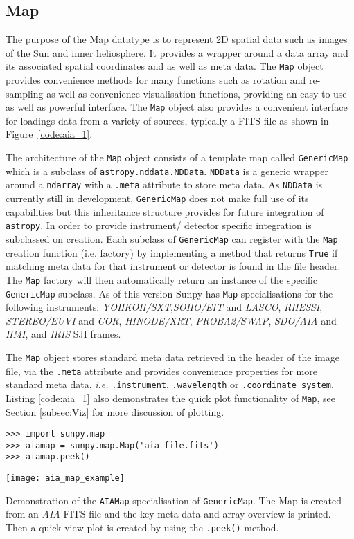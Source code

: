 \subsection{Map}
The purpose of the Map datatype is to represent 2D spatial data such as images of the Sun and 
inner heliosphere. It provides a wrapper around a data array and its associated
spatial coordinates and as well as meta data. The \texttt{Map} object provides 
convenience methods for many functions 
such as rotation and re-sampling as well as convenience visualisation 
functions, providing an easy to use as well as powerful interface. The \texttt{Map} object
also provides a convenient interface for loadings data from a variety of sources, typically
a FITS file as shown in Figure~\ref{code:aia_1}.

The architecture of the \texttt{Map} object consists of a template map called
\texttt{GenericMap} which is a subclass of \texttt{astropy.nddata.NDData}. \texttt{NDData} is a 
generic wrapper around a \texttt{ndarray} with a \texttt{.meta} attribute to store meta data.
As \texttt{NDData} is currently still in development, \texttt{GenericMap} does not make full
use of its capabilities but this inheritance structure provides 
for future integration of \texttt{astropy}. In order to provide instrument/
detector specific integration  is subclassed on creation. 
Each subclass of \texttt{GenericMap} can register with the \texttt{Map} creation function (i.e. factory)
by implementing a method that returns \texttt{True} if matching meta data 
for that instrument or detector is found in the file header. The \texttt{Map} factory 
will then automatically return an instance of the specific \texttt{GenericMap} 
subclass. As of this version Sunpy has \texttt{Map} specialisations for the 
following instruments: 
\textit{YOHKOH/SXT},\textit{SOHO/EIT} and \textit{LASCO}, \textit{RHESSI}, 
\textit{STEREO/EUVI} and \textit{COR}, \textit{HINODE/XRT},
\textit{PROBA2/SWAP}, \textit{SDO/AIA} and \textit{HMI}, 
and \textit{IRIS} SJI frames. 

The \texttt{Map} object stores standard meta data retrieved in the header of 
the image file, via the \texttt{.meta} attribute and provides convenience 
properties for more standard meta data, \textit{i.e.} \texttt{.instrument}, 
\texttt{.wavelength} or \texttt{.coordinate\_system}. 
Listing \ref{code:aia_1} also demonstrates the quick plot functionality of 
\texttt{Map}, see Section \ref{subsec:Viz} for more discussion of plotting.

\begin{listing}[H]
\begin{verbatim}
>>> import sunpy.map
>>> aiamap = sunpy.map.Map('aia_file.fits')
>>> aiamap.peek()
\end{verbatim}
\texttt{[image: aia\_map\_example]}
\caption{Demonstration of the \texttt{AIAMap} specialisation of 
\texttt{GenericMap}. The Map is created from an \textit{AIA} FITS file and the 
key meta data and array overview is printed. Then a quick view plot is created 
by using the \texttt{.peek()} method.}
\label{code:aia_1}
\end{listing}

